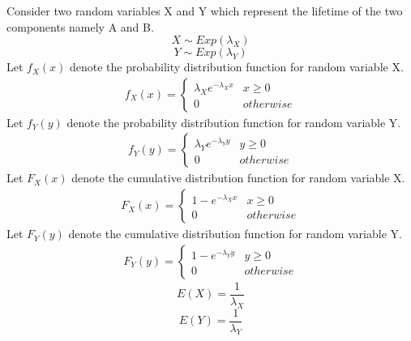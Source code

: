 
Consider two random variables X and Y which represent the lifetime of the two components namely A and B.
\begin{equation}
    X \sim Exp(\lambda_X)
\end{equation}
\begin{equation}
    Y \sim Exp(\lambda_Y)
\end{equation}
Let $f_X(x)$ denote the probability distribution function for random variable X.
\begin{align}
f_{X}(x)=
 \begin{cases} 
      \lambda_X  e^{-\lambda_X  x} & x \geq 0 \\
      0 & otherwise
 \end{cases}
\end{align}
Let $f_Y(y)$ denote the probability distribution function for random variable Y.
\begin{align}
f_{Y}(y)=
 \begin{cases} 
      \lambda_Y  e^{-\lambda_Y  y} & y \geq 0 \\
      0 & otherwise
 \end{cases}
 \end{align}
 Let $F_X(x)$ denote the cumulative distribution function for random variable X.
\begin{align}
F_{X}(x)=
 \begin{cases} 
      1-e^{-\lambda_X  x} & x \geq 0 \\
      0 & otherwise
 \end{cases}
\end{align}
Let $F_Y(y)$ denote the cumulative distribution function for random variable Y.
\begin{align}
F_{Y}(y)=
 \begin{cases} 
      1-e^{-\lambda_Y  y} & y \geq 0 \\
      0 & otherwise
 \end{cases}
 \end{align}
\begin{equation}\label{june2013-42:meanx}
    E(X)=\dfrac{1}{\lambda_X}
\end{equation}
\begin{equation}\label{june2013-42:meany}
    E(Y)=\dfrac{1}{\lambda_Y}
\end{equation}
